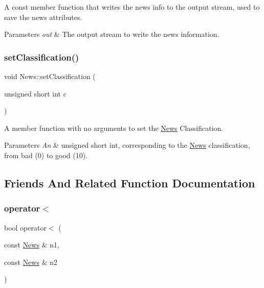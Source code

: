 A const member function that writes the news\textquotesingle{} info to the output stream, used to save the news\textquotesingle{} attributes. 
\begin{DoxyParams}{Parameters}
{\em out} & The output stream to write the news\textquotesingle{} information. \\
\hline
\end{DoxyParams}
\hypertarget{class_news_adc82fcf213f23b2598a26d59a697d651}{}\label{class_news_adc82fcf213f23b2598a26d59a697d651} 
\subsubsection{\texorpdfstring{set\+Classification()}{setClassification()}}
{\footnotesize\ttfamily void News\+::set\+Classification (\begin{DoxyParamCaption}\item[{unsigned short int}]{c }\end{DoxyParamCaption})}

A member function with no arguments to set the \hyperlink{class_news}{News}\textquotesingle{} Classification. 
\begin{DoxyParams}{Parameters}
{\em An} & unsigned short int, corresponding to the \hyperlink{class_news}{News} classification, from bad (0) to good (10). \\
\hline
\end{DoxyParams}


\subsection{Friends And Related Function Documentation}
\hypertarget{class_news_acca70bd436d0fa5aef509c188a8195a4}{}\label{class_news_acca70bd436d0fa5aef509c188a8195a4} 
\subsubsection{\texorpdfstring{operator$<$}{operator<}}
{\footnotesize\ttfamily bool operator$<$ (\begin{DoxyParamCaption}\item[{const \hyperlink{class_news}{News} \&}]{n1,  }\item[{const \hyperlink{class_news}{News} \&}]{n2 }\end{DoxyParamCaption})\hspace{0.3cm}{\ttfamily [friend]}}

